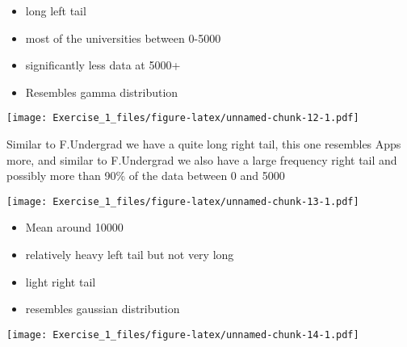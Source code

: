 \documentclass[]{article}
\newenvironment{Shaded}{\begin{snugshade}}{\end{snugshade}}
\newcommand{\CommentTok}[1]{\textcolor[rgb]{0.56,0.35,0.01}{\textit{#1}}}
\newcommand{\KeywordTok}[1]{\textcolor[rgb]{0.13,0.29,0.53}{\textbf{#1}}}
\newcommand{\NormalTok}[1]{#1}
\newcommand{\OperatorTok}[1]{\textcolor[rgb]{0.81,0.36,0.00}{\textbf{#1}}}
\providecommand{\tightlist}{%
  \setlength{\itemsep}{0pt}\setlength{\parskip}{0pt}}
\begin{document}
\begin{itemize}
\tightlist
\item
  long left tail
\item
  most of the universities between 0-5000
\item
  significantly less data at 5000+
\item
  Resembles gamma distribution
\end{itemize}

\begin{Shaded}
\end{Shaded}

\texttt{[image: Exercise\_1\_files/figure-latex/unnamed-chunk-12-1.pdf]}

Similar to F.Undergrad we have a quite long right tail, this one
resembles Apps more, and similar to F.Undergrad we also have a large
frequency right tail and possibly more than 90\% of the data between 0
and 5000

\begin{Shaded}
\end{Shaded}

\texttt{[image: Exercise\_1\_files/figure-latex/unnamed-chunk-13-1.pdf]}

\begin{itemize}
\tightlist
\item
  Mean around 10000
\item
  relatively heavy left tail but not very long
\item
  light right tail
\item
  resembles gaussian distribution
\end{itemize}

\begin{Shaded}
\end{Shaded}

\texttt{[image: Exercise\_1\_files/figure-latex/unnamed-chunk-14-1.pdf]}
\end{document}
